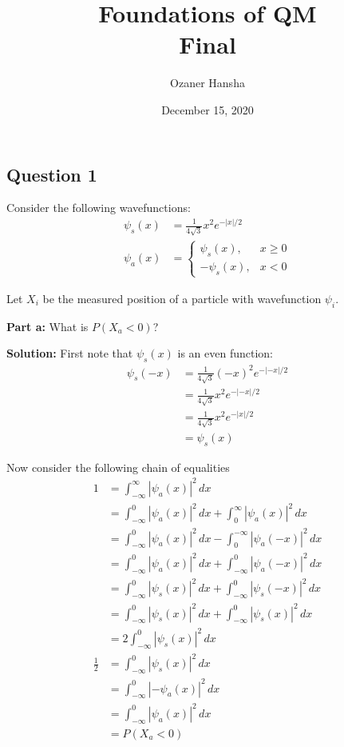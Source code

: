 \documentclass{article}
\begin{document}
\title{Foundations of QM\\ Final}
\author{Ozaner Hansha}
\date{December 15, 2020}
\maketitle

\subsection*{Question 1}
Consider the following wavefunctions:
\begin{align*}
    \psi_s(x)&=\frac{1}{4\sqrt{3}}x^2e^{-|x|/2}\\
    \psi_a(x)&=\begin{cases}
        \psi_s(x),&x\ge0\\
        -\psi_s(x),&x<0
    \end{cases}
\end{align*}

Let $X_i$ be the measured position of a particle with wavefunction $\psi_i$.
\bigskip

\noindent\textbf{Part a:} What is $P(X_a<0)$?
\bigskip

\noindent\textbf{Solution:} First note that $\psi_s(x)$ is an even function:
\begin{align*}
    \psi_s(-x)&=\frac{1}{4\sqrt{3}}(-x)^2e^{-|-x|/2}\tag{def. of $\psi_s$}\\
    &=\frac{1}{4\sqrt{3}}x^2e^{-|-x|/2}\tag{$x^2=(-x)^2$}\\
    &=\frac{1}{4\sqrt{3}}x^2e^{-|x|/2}\tag{$|x|=|-x|$}\\
    &=\psi_s(x)\tag{def. of $\psi_s$}
\end{align*}

Now consider the following chain of equalities
\begin{align*}
    1&=\int_{-\infty}^\infty|\psi_a(x)|^2\,dx\tag{integral of a pdf over support is 1}\\
    &=\int_{-\infty}^0|\psi_a(x)|^2\,dx+\int_0^\infty|\psi_a(x)|^2\,dx\\
    &=\int_{-\infty}^0|\psi_a(x)|^2\,dx-\int^{-\infty}_0|\psi_a(-x)|^2\,dx\tag{expansion of interval of integration by $-1$}\\
    &=\int_{-\infty}^0|\psi_a(x)|^2\,dx+\int_{-\infty}^0|\psi_a(-x)|^2\,dx\tag{reverse interval of integration}\\
    &=\int_{-\infty}^0|\psi_s(x)|^2\,dx+\int_{-\infty}^0|\psi_s(-x)|^2\,dx\tag{$\psi_a=\psi_s$ for $x\ge0$}\\
    &=\int_{-\infty}^0|\psi_s(x)|^2\,dx+\int_{-\infty}^0|\psi_s(x)|^2\,dx\tag{$\psi_s$ is an even function}\\
    &=2\int_{-\infty}^0|\psi_s(x)|^2\,dx\\
    \frac{1}{2}&=\int_{-\infty}^0|\psi_s(x)|^2\,dx\\
    &=\int_{-\infty}^0|-\psi_a(x)|^2\,dx\tag{$\psi_a=-\psi_s$ for $x<0$}\\
    &=\int_{-\infty}^0|\psi_a(x)|^2\,dx\\
    &=P(X_a<0)
\end{align*}
\end{document}
